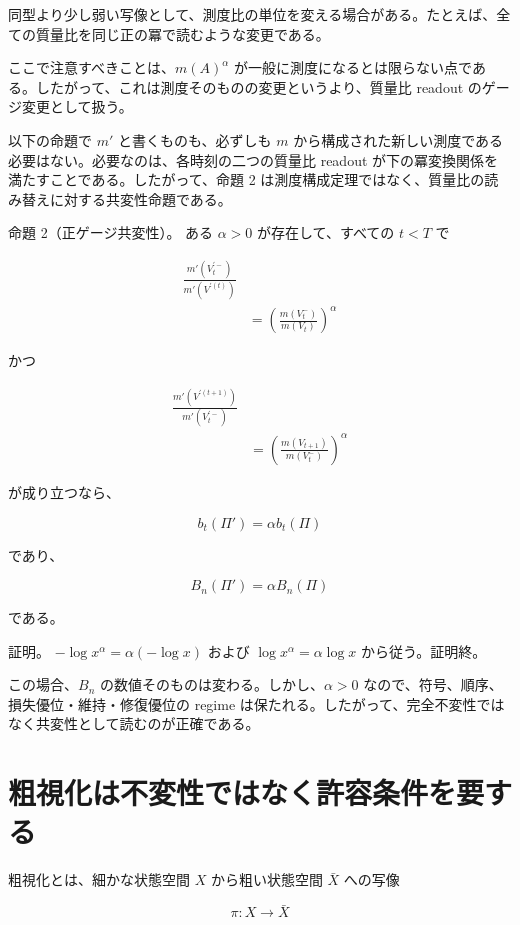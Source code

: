 \documentclass[12pt,a4paper]{article}
\begin{document}
同型より少し弱い写像として、測度比の単位を変える場合がある。たとえば、全ての質量比を同じ正の冪で読むような変更である。

ここで注意すべきことは、\(m(A)^\alpha\) が一般に測度になるとは限らない点である。したがって、これは測度そのものの変更というより、質量比 readout のゲージ変更として扱う。

以下の命題で \(m'\) と書くものも、必ずしも \(m\) から構成された新しい測度である必要はない。必要なのは、各時刻の二つの質量比 readout が下の冪変換関係を満たすことである。したがって、命題 2 は測度構成定理ではなく、質量比の読み替えに対する共変性命題である。

命題 2（正ゲージ共変性）。 ある \(\alpha>0\) が存在して、すべての \(t<T\) で

\[
\begin{aligned}
\frac{m'(V_{t}^{\prime -})}{m'(V^{\prime(t)})} \\
&= \left(\frac{m(V_{t}^-)}{m(V_{t})}\right)^\alpha
\end{aligned}
\]

かつ

\[
\begin{aligned}
\frac{m'(V^{\prime(t+1)})}{m'(V_{t}^{\prime -})} \\
&= \left(\frac{m(V_{t+1})}{m(V_{t}^-)}\right)^\alpha
\end{aligned}
\]

が成り立つなら、

\[
b_{t}(\Pi')=\alpha b_{t}(\Pi)
\]

であり、

\[
B_{n}(\Pi')=\alpha B_{n}(\Pi)
\]

である。

証明。 \(-\log x^\alpha=\alpha(-\log x)\) および \(\log x^\alpha=\alpha \log x\) から従う。証明終。

この場合、\(B_{n}\) の数値そのものは変わる。しかし、\(\alpha>0\) なので、符号、順序、損失優位・維持・修復優位の regime は保たれる。したがって、完全不変性ではなく共変性として読むのが正確である。

\section{粗視化は不変性ではなく許容条件を要する}\label{ux7c97ux8996ux5316ux306fux4e0dux5909ux6027ux3067ux306fux306aux304fux8a31ux5bb9ux6761ux4ef6ux3092ux8981ux3059ux308b}

粗視化とは、細かな状態空間 \(X\) から粗い状態空間 \(\bar X\) への写像

\[
\pi:X\to\bar X
\]
\end{document}
